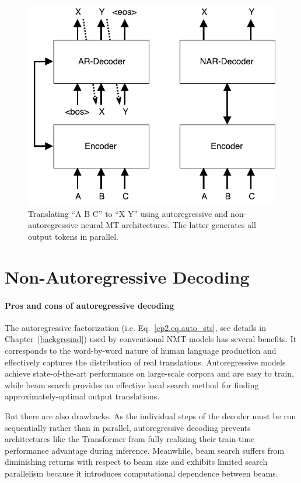 \begin{figure}[t]
\centering
\includegraphics[width=0.6\linewidth]{figs/nat/ar_nmt}
\caption{\label{cp8.fig.ar_vs_nar} Translating ``A B C'' to ``X Y'' using autoregressive and non-autoregressive neural MT architectures. The latter generates all output tokens in parallel.}
\end{figure}


\section{Non-Autoregressive Decoding}
\paragraph{Pros and cons of autoregressive decoding}
The autoregressive factorization (i.e. Eq.~\eqref{cp2.eq.auto_sts}, see details in Chapter~\ref{background}) used by conventional NMT models has several benefits. It corresponds to the word-by-word nature of human language production and effectively captures the distribution of real translations. Autoregressive models achieve state-of-the-art performance on large-scale corpora and are easy to train, while beam search provides an effective local search method for finding approximately-optimal output translations.

But there are also drawbacks. As the individual steps of the decoder must be run sequentially rather than in parallel, autoregressive decoding prevents architectures like the Transformer from fully realizing their train-time performance advantage during inference. Meanwhile, beam search suffers from diminishing returns with respect to beam size \citep{koehn2017six} and exhibits limited search parallelism because it introduces computational dependence between beams.


